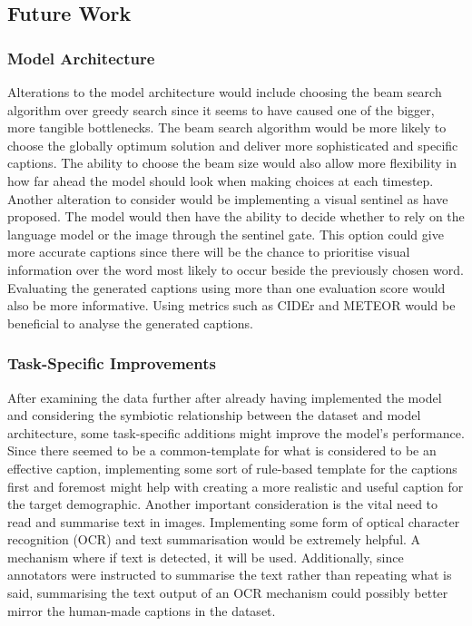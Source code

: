 \documentclass[11pt,a4paper]{article}
\begin{document}
\subsection{Future Work}
\label{ssec:futurework}

\subsubsection{Model Architecture}
\label{sssec:modelarchitecture}
Alterations to the model architecture would include choosing the beam search algorithm over greedy search since it seems to have caused one of the bigger, more tangible bottlenecks. The beam search algorithm would be more likely to choose the globally optimum solution and deliver more sophisticated and specific captions. The ability to choose the beam size would also allow more flexibility in how far ahead the model should look when making choices at each timestep. Another alteration to consider would be implementing a visual sentinel as \citet{Lu-whentolook} have proposed. The model would then have the ability to decide whether to rely on the language model or the image through the sentinel gate. This option could give more accurate captions since there will be the chance to prioritise visual information over the word most likely to occur beside the previously chosen word. Evaluating the generated captions using more than one evaluation score would also be more informative. Using metrics such as CIDEr and METEOR would be beneficial to analyse the generated captions.

\subsubsection{Task-Specific Improvements}
\label{sssec:taskspecificimprov}
After examining the data further after already having implemented the model and considering the symbiotic relationship between the dataset and model architecture, some task-specific additions might improve the model’s performance. Since there seemed to be a common-template for what is considered to be an effective caption, implementing some sort of rule-based template for the captions first and foremost might help with creating a more realistic and useful caption for the target demographic. Another important consideration is the vital need to read and summarise text in images. Implementing some form of optical character recognition (OCR) and text summarisation would be extremely helpful. A mechanism where if text is detected, it will be used. Additionally, since annotators were instructed to summarise the text rather than repeating what is said, summarising the text output of an OCR mechanism could possibly better mirror the human-made captions in the dataset.



\label{sec:references}
\end{document}
